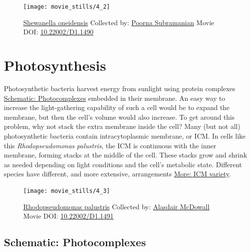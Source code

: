 \documentclass[]{tufte-book}
\begin{document}
\begin{figure}
\texttt{[image: movie\_stills/4\_2]} \caption[\protect\hyperlink{tree}{Shewanella oneidensis} Collected by:
\protect\hyperlink{poorna_subramanian}{Poorna Subramanian} Movie DOI:
\href{https://doi.org/10.22002/D1.1490}{10.22002/D1.1490}]{\protect\hyperlink{tree}{Shewanella oneidensis} Collected by:
\protect\hyperlink{poorna_subramanian}{Poorna Subramanian} Movie DOI:
\href{https://doi.org/10.22002/D1.1490}{10.22002/D1.1490}}\label{fig:4-2}
\end{figure}

\section{Photosynthesis}\label{photosynthesis}

Photosynthetic bacteria harvest energy from sunlight using protein
complexes \protect\hyperlink{Photocomplexes}{Schematic: Photocomplexes}
embedded in their membrane. An easy way to increase the light-gathering
capability of such a cell would be to expand the membrane, but then the
cell's volume would also increase. To get around this problem, why not
stack the extra membrane inside the cell? Many (but not all)
photosynthetic bacteria contain intracytoplasmic membrane, or ICM. In
cells like this \emph{Rhodopseudomonas palustris}, the ICM is continuous
with the inner membrane, forming stacks at the middle of the cell. These
stacks grow and shrink as needed depending on light conditions and the
cell's metabolic state. Different species have different, and more
extensive, arrangements \protect\hyperlink{ICM_variety}{More: ICM
variety}.





\begin{figure}
\texttt{[image: movie\_stills/4\_3]} \caption[\protect\hyperlink{tree}{Rhodopseudomonas palustris} Collected
by: \protect\hyperlink{alasdair_mcdowall}{Alasdair McDowall} Movie DOI:
\href{https://doi.org/10.22002/D1.1491}{10.22002/D1.1491}]{\protect\hyperlink{tree}{Rhodopseudomonas palustris} Collected
by: \protect\hyperlink{alasdair_mcdowall}{Alasdair McDowall} Movie DOI:
\href{https://doi.org/10.22002/D1.1491}{10.22002/D1.1491}}\label{fig:4-3}
\end{figure}

\hypertarget{Photocomplexes}{\subsection*{Schematic:
Photocomplexes}\label{Photocomplexes}}
\end{document}
